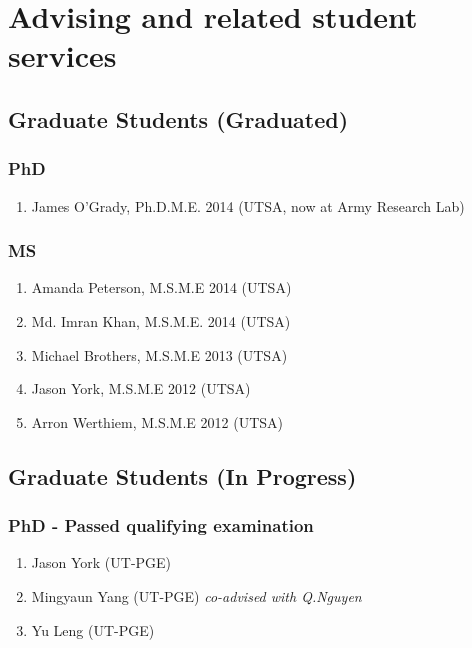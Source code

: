 \section*{Advising and related student services}



\subsection*{Graduate Students (Graduated)}

\subsubsection*{PhD}
\begin{enumerate}
    \item James O'Grady, Ph.D.M.E. 2014 (UTSA, now at Army Research Lab)
\end{enumerate}

\subsubsection*{MS}
\begin{enumerate}
    \item Amanda Peterson, M.S.M.E 2014 (UTSA)
    \item Md. Imran Khan, M.S.M.E. 2014 (UTSA)
    \item Michael Brothers, M.S.M.E 2013 (UTSA)
    \item Jason York, M.S.M.E 2012 (UTSA)
    \item Arron Werthiem, M.S.M.E 2012 (UTSA)
\end{enumerate}

\subsection*{Graduate Students (In Progress)}

\subsubsection*{PhD - Passed qualifying examination}
\begin{enumerate}
    \item Jason York (UT-PGE)
    \item Mingyaun Yang (UT-PGE) \emph{co-advised with Q.Nguyen}
    \item Yu Leng (UT-PGE)
\end{enumerate}

